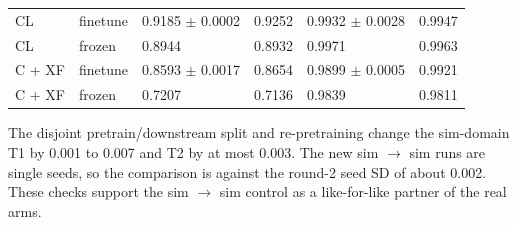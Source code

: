 \documentclass[10pt,a4paper]{article}
\begin{document}
\begin{enumerate}
\begin{center}
\begin{tabularx}{\linewidth}{LLLLLL}
\midrule
CL & finetune & 0.9185 $\pm$ 0.0002 & 0.9252 & 0.9932 $\pm$ 0.0028 & 0.9947 \\
CL & frozen & 0.8944 & 0.8932 & 0.9971 & 0.9963 \\
C + XF & finetune & 0.8593 $\pm$ 0.0017 & 0.8654 & 0.9899 $\pm$ 0.0005 & 0.9921 \\
C + XF & frozen & 0.7207 & 0.7136 & 0.9839 & 0.9811 \\
\bottomrule
\end{tabularx}
\end{center}
The disjoint pretrain/downstream split and re-pretraining change the sim-domain T1 by 0.001 to 0.007 and T2 by at most 0.003. The new sim $\rightarrow$ sim runs are single seeds, so the comparison is against the round-2 seed SD of about 0.002. These checks support the sim $\rightarrow$ sim control as a like-for-like partner of the real arms.
\end{enumerate}
\end{document}
